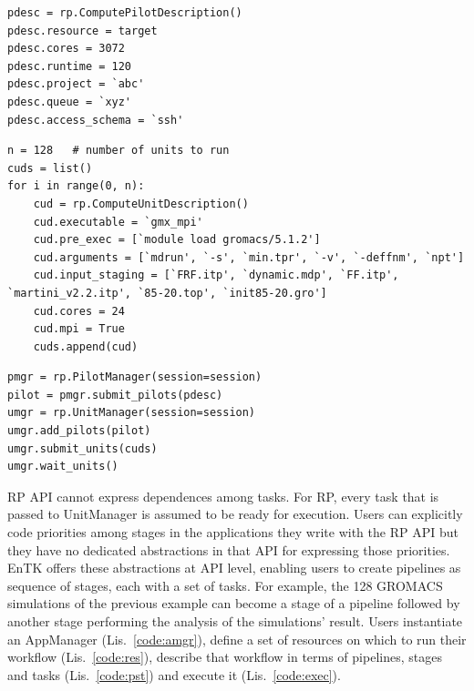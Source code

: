 \documentclass[preprint,12pt, a4paper]{elsarticle}
\begin{document}
\begin{lstlisting}
pdesc = rp.ComputePilotDescription()        
pdesc.resource = target
pdesc.cores = 3072
pdesc.runtime = 120
pdesc.project = `abc'
pdesc.queue = `xyz'
pdesc.access_schema = `ssh'
\end{lstlisting}

\begin{lstlisting}
n = 128   # number of units to run
cuds = list()
for i in range(0, n):
    cud = rp.ComputeUnitDescription()
    cud.executable = `gmx_mpi'
    cud.pre_exec = [`module load gromacs/5.1.2']
    cud.arguments = [`mdrun', `-s', `min.tpr', `-v', `-deffnm', `npt']
    cud.input_staging = [`FRF.itp', `dynamic.mdp', `FF.itp', `martini_v2.2.itp', `85-20.top', `init85-20.gro'] 
    cud.cores = 24
    cud.mpi = True    
    cuds.append(cud)
\end{lstlisting}

\begin{lstlisting}
pmgr = rp.PilotManager(session=session)
pilot = pmgr.submit_pilots(pdesc)
umgr = rp.UnitManager(session=session)
umgr.add_pilots(pilot)
umgr.submit_units(cuds)
umgr.wait_units()
\end{lstlisting}

RP API cannot express dependences among tasks. For RP, every task that is
passed to UnitManager is assumed to be ready for execution. Users can
explicitly code priorities among stages in the applications they write with
the RP API but they have no dedicated abstractions in that API for expressing
those priorities. EnTK offers these abstractions at API level, enabling users
to create pipelines as sequence of stages, each with a set of tasks. For
example, the 128 GROMACS simulations of the previous example can become a
stage of a pipeline followed by another stage performing the analysis of the
simulations' result. Users instantiate an AppManager (Lis.~\ref{code:amgr}),
define a set of resources on which to run their workflow
(Lis.~\ref{code:res}), describe that workflow in terms of pipelines, stages
and tasks (Lis.~\ref{code:pst}) and execute it (Lis.~\ref{code:exec}).
\end{document}
